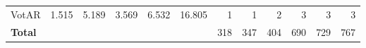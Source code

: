 \begin{table*}[t]
\begin{tabular}{l||r|r|r|r|r||r|r|r||r|r|r}
  VotAR                  & 1.515                 & 5.189                    & 3.569                      & 6.532                                      & 16.805                                  & 1                           & 1                            & 2                         & 3                           & 3                            & 3                          \\\hhline{=#*{4}{=}=#=|=|=#=|=|=}
    \textbf{Total}       & \multicolumn{1}{r}{}  & \multicolumn{1}{r}{}     & \multicolumn{1}{r}{}       & \multicolumn{1}{r}{}                       & \multicolumn{1}{r||}{}                    & 318                         & 347                          & 404                       & 690                         & 729                          & 767
  \end{tabular}
\end{table*}
